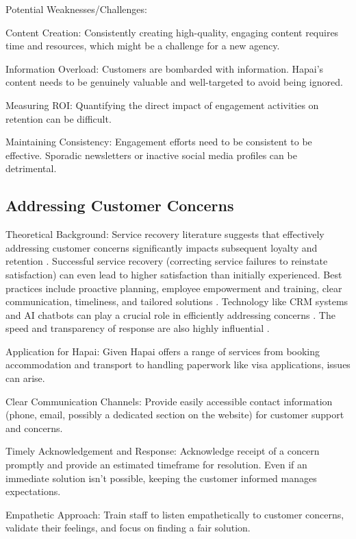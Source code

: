 \documentclass{article}
\begin{document}
Potential Weaknesses/Challenges:

Content Creation: Consistently creating high-quality, engaging content requires time and resources, which might be a challenge for a new agency.

Information Overload: Customers are bombarded with information. Hapai’s content needs to be genuinely valuable and well-targeted to avoid being ignored.

Measuring ROI: Quantifying the direct impact of engagement activities on retention can be difficult.

Maintaining Consistency: Engagement efforts need to be consistent to be effective. Sporadic newsletters or inactive social media profiles can be detrimental.

\subsection{Addressing Customer Concerns}

Theoretical Background:
Service recovery literature suggests that effectively addressing customer concerns significantly impacts subsequent loyalty and retention \cite{petzer_customer_nodate}. Successful service recovery (correcting service failures to reinstate satisfaction) can even lead to higher satisfaction than initially experienced. Best practices include proactive planning, employee empowerment and training, clear communication, timeliness, and tailored solutions \cite{petzer_customer_nodate}. Technology like CRM systems and AI chatbots can play a crucial role in efficiently addressing concerns \cite{ayub_artificial_2025}. The speed and transparency of response are also highly influential \cite{garg_role_2024,prados-castillo_review_2023}.

Application for Hapai:
Given Hapai offers a range of services from booking accommodation and transport to handling paperwork like visa applications, issues can arise.

Clear Communication Channels: Provide easily accessible contact information (phone, email, possibly a dedicated section on the website) for customer support and concerns.

Timely Acknowledgement and Response: Acknowledge receipt of a concern promptly and provide an estimated timeframe for resolution. Even if an immediate solution isn't possible, keeping the customer informed manages expectations.

Empathetic Approach: Train staff to listen empathetically to customer concerns, validate their feelings, and focus on finding a fair solution.
\end{document}
